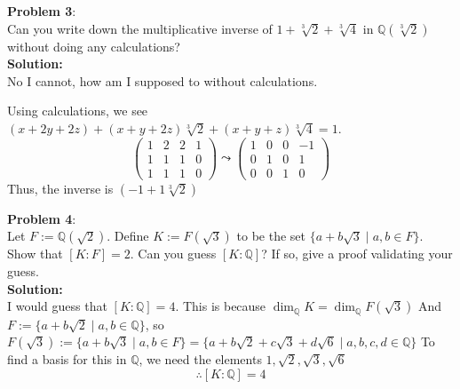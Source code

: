 \documentclass[11pt]{article}
\newcommand{\prob}[3]{\begin{flushleft}
        \textbf{Problem #1}: \\
        #2 
		\textbf{Solution:} 
		#3

\end{flushleft}}
\begin{document}
\prob{3}{
  Can you write down the multiplicative inverse of $1 + \sqrt[3]{2} + \sqrt[3]{4}$ in $\mathbb{Q}(\sqrt[3]{2})$ without doing any calculations? \\
}{\\
  No I cannot, how am I supposed to without calculations.

  Using calculations, we see $(x + 2y + 2z) + (x + y + 2z) \sqrt[3]{2} + (x + y + z) \sqrt[3]{4} = 1$.
  $$\begin{pmatrix}
      1 & 2 & 2 & 1 \\
      1 & 1 & 1 & 0 \\
      1 & 1 & 1 & 0
    \end{pmatrix} \leadsto
    \begin{pmatrix}
      1 & 0 & 0 & -1 \\
      0 & 1 & 0 & 1  \\
      0 & 0 & 1 & 0
    \end{pmatrix}$$
  Thus, the inverse is $(-1 + 1 \sqrt[3]{2} )$
}

\prob{4}{
  Let $F := \mathbb{Q}(\sqrt{2})$. Define $K := F(\sqrt{3})$ to be the set $\{ a + b \sqrt{3} \mid a, b \in F \}$. Show that $[K : F] = 2$.
  Can you guess $[K : \mathbb{Q}]$? If so, give a proof validating your guess. \\
}{\\
  I would guess that $[K : \mathbb{Q}] = 4$.
  This is because $\dim_{\mathbb{Q}} K = \dim_{\mathbb{Q}} F(\sqrt{3})$
  And $F := \{ a + b \sqrt{2} \mid a,b \in \mathbb{Q} \}$, so
  $F(\sqrt{3}) := \{ a + b \sqrt{3} \mid a,b \in F \} = \{ a + b \sqrt{2} + c \sqrt{3} + d \sqrt{6} \mid a,b,c,d \in \mathbb{Q} \}$
  To find a basis for this in $\mathbb{Q}$, we need the elements $1, \sqrt{2}, \sqrt{3}, \sqrt{6}$
  $$\therefore [K : \mathbb{Q}] = 4$$
}
\end{document}
